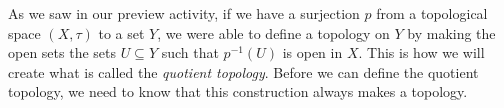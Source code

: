 \begin{comment}

\ActivitySolution

\be
\item The only possibilities for sets $U$ are those with $p^{-1}(U)$ being $\emptyset$, $\{1,2\}$, $\{4,6\}$, $\{1,2,4,6\}$, and $X$. Since $p$ is a surjection, the only time $p^{-1}(U) = \emptyset$ is when $U = \emptyset$. Also, $p^{-1}(U) = X$ when $X = Y$. We consider the remaining cases in turn. 

\begin{itemize}
\item Since $p(1) = p(6) = b$ and $p(2) = a$, $p^{-1}(U)$ can never be  $\{1,2\}$.
\item Since $p(4) = d$, and $p(2) = p(6) = a$, $p^{-1}(U)$ can never be $\{4,6\}$. 
\item Since $p(1) = b$, $p(2) = p(6) = a$, and $p(4) = d$, $p^{-1}(U) = \{1,2,4,6\}$ when $U = \{a,b,d\}$. 
\end{itemize}
Thus, 
\[\sigma = \{\emptyset, \{a,b,d\}, Y\}.\]

\item By inspection we can see that unions and intersections of sets in $\sigma$ remain in $\sigma$, so $\sigma$ is a topology on $Y$.  

\item By definition, if $U$ is in $\sigma$, then $p^{-1}(U)$ is in $\tau$. So the inverse image of any open set is open under $p$ and $p$ is continuous.

\item Suppose $\sigma'$ is a topology on $Y$ with $\sigma \subset \sigma'$. Then there exists $O \in \sigma' \setminus \sigma$. If $p^{-1}(O)$ were open, then we would have $O \in \sigma$ be definition. But this is a contradiction. So $p^{-1}(O)$ is not open and $p$ is not continuous from $(X \tau)$ to $(Y, \sigma')$. 

\ea

\end{comment}

\label{sec_quotient_space}

As we saw in our preview activity, if we have a surjection $p$ from a topological space $(X,\tau)$ to a set $Y$, we were able to define a topology on $Y$ by making the open sets the sets $U \subseteq Y$ such that $p^{-1}(U)$ is open in $X$. This is how we will create what is called the \emph{quotient topology}.  Before we can define the quotient topology, we need to know that this construction always makes a topology.

